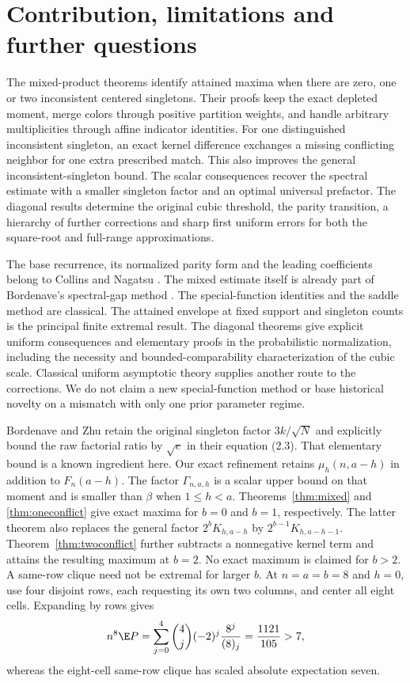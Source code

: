 \section{Contribution, limitations and further questions}

The mixed-product theorems identify attained maxima when there are zero, one or two inconsistent centered singletons. Their proofs keep the exact depleted moment, merge colors through positive partition weights, and handle arbitrary multiplicities through affine indicator identities. For one distinguished inconsistent singleton, an exact kernel difference exchanges a missing conflicting neighbor for one extra prescribed match. This also improves the general inconsistent-singleton bound. The scalar consequences recover the spectral estimate with a smaller singleton factor and an optimal universal prefactor. The diagonal results determine the original cubic threshold, the parity transition, a hierarchy of further corrections and sharp first uniform errors for both the square-root and full-range approximations.

The base recurrence, its normalized parity form and the leading coefficients belong to Collins and Nagatsu \cite{CN}. The mixed estimate itself is already part of Bordenave's spectral-gap method \cite{Bordenave}. The special-function identities and the saddle method are classical. The attained envelope at fixed support and singleton counts is the principal finite extremal result. The diagonal theorems give explicit uniform consequences and elementary proofs in the probabilistic normalization, including the necessity and bounded-comparability characterization of the cubic scale. Classical uniform asymptotic theory supplies another route to the corrections. We do not claim a new special-function method or base historical novelty on a mismatch with only one prior parameter regime.

Bordenave and Zhu \cite[Lemma 2.1]{BZ} retain the original singleton factor $3k/\sqrt N$ and explicitly bound the raw factorial ratio by $\sqrt e$ in their equation (2.3). That elementary bound is a known ingredient here. Our exact refinement retains $\mu_h(n,a-h)$ in addition to $F_n(a-h)$. The factor $\Gamma_{n,a,h}$ is a scalar upper bound on that moment and is smaller than $\beta$ when $1\le h<a$. Theorems~\ref{thm:mixed} and \ref{thm:oneconflict} give exact maxima for $b=0$ and $b=1$, respectively. The latter theorem also replaces the general factor $2^bK_{h,a-h}$ by $2^{b-1}K_{h,a-h-1}$. Theorem~\ref{thm:twoconflict} further subtracts a nonnegative kernel term and attains the resulting maximum at $b=2$. No exact maximum is claimed for $b>2$. A same-row clique need not be extremal for larger $b$. At $n=a=b=8$ and $h=0$, use four disjoint rows, each requesting its own two columns, and center all eight cells. Expanding by rows gives
\[
n^8\E P=\sum_{j=0}^4\binom4j(-2)^j\frac{8^j}{(8)_j}
=\frac{1121}{105}>7,
\]
whereas the eight-cell same-row clique has scaled absolute expectation seven.

